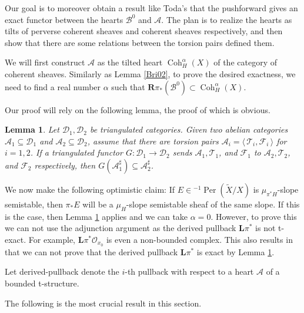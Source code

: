 \documentclass[12pt]{amsart}
\newtheorem{lemma}[theorem]{Lemma}
\theoremstyle{definition}
\DeclareMathOperator{\Coh}{Coh}
\DeclareMathOperator{\Per}{Per}
\begin{document}
Our goal is to moreover obtain a result like Toda's that the pushforward gives an exact functor between the hearts $\mathcal{B}^0$ and $\mathcal{A}$.
The plan is to realize the hearts as tilts of perverse coherent sheaves and coherent sheaves respectively,
and then show that there are some relations between the torsion pairs defined them.

We will first construct $\mathcal{A}$ as the tilted heart $\Coh^\alpha_H(X)$ of the category of coherent sheaves.
Similarly as Lemma \ref{Bri02}, to prove the desired exactness, we need to find a real number $\alpha$ such that $\mathbf{R}\pi_\ast (\mathcal{B}^0) \subset \Coh^\alpha_H(X)$.

Our proof will rely on the following lemma,
the proof of which is obvious.
\begin{lemma}\label{1}
Let $\mathcal{D}_1, \mathcal{D}_2$ be triangulated categories. 
Given two abelian categories $\mathcal{A}_1 \subseteq \mathcal{D}_1$ and $\mathcal{A}_2 \subseteq \mathcal{D}_2$, assume that there are torsion pairs $\mathcal{A}_i = \langle \, \mathcal{T}_i,\mathcal{F}_i \, \rangle$ for $i=1,2$. 
If a triangulated functor $G \colon \mathcal{D}_1 \longrightarrow \mathcal{D}_2$ sends $\mathcal{A}_1,\mathcal{T}_1$, and $\mathcal{F}_1$ to $\mathcal{A}_2,\mathcal{T}_2$, and $\mathcal{F}_2$ respectively,
then $G(\mathcal{A}^\sharp_1) \subseteq \mathcal{A}^\sharp_2$.
\end{lemma}



We now make the following optimistic claim:
If $E \in {^{-1}\Per(\widetilde{X}/X)}$ is $\mu_{\pi^\ast H}$-slope semistable, then $\pi_\ast E$ will be a $\mu_{H}$-slope semistable sheaf of the same slope.
If this is the case, then Lemma \ref{1} applies and we can take $\alpha = 0$.
However, to prove this we can not use the adjunction argument as the derived pullback $\mathbf{L}\pi^\ast$ is not t-exact.
For example, $\mathbf{L}\pi^\ast \mathcal{O}_{x_0}$ is even a non-bounded complex. 
This also results in that we can not prove that the derived pullback $\mathbf{L}\pi^\ast$ is exact by Lemma \ref{1}.

Let \gls{derived-pullback} denote the $i$-th pullback with respect to a heart $\mathcal{A}$ of a bounded t-structure.


The following is the most crucial result in this section.
\end{document}
